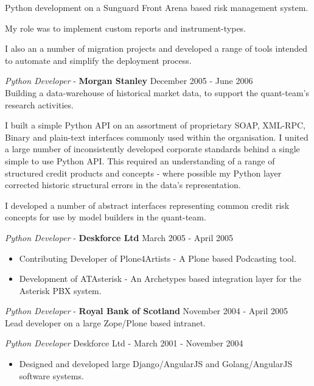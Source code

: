 \documentclass[margin, 10pt]{res} %
\begin{document}
\begin{resume}
        Python development on a Sunguard Front Arena based risk management system.

        My role was to implement custom reports and instrument-types.

        I also an a number of migration projects and developed a range of tools intended to automate and simplify the deployment process.

        {\sl Python Developer} - \textbf{Morgan Stanley} \hfill December 2005 - June 2006\\


        Building a data-warehouse of historical market data, to support the quant-team's research activities.

        I built a simple Python API on an assortment of proprietary SOAP, XML-RPC, Binary and plain-text interfaces commonly used within the organisation. I united a large number of inconsistently developed corporate standards behind a single simple to use Python API. This required an understanding of a range of structured credit products and concepts - where possible my Python layer corrected historic structural errors in the data's representation.

        I developed a number of abstract interfaces representing common credit risk concepts for use by model builders in the quant-team.

        {\sl Python Developer} - \textbf{Deskforce Ltd} \hfill March 2005 - April 2005\\

        \begin{itemize}
            \item Contributing Developer of Plone4Artists - A Plone based Podcasting tool.
            \item Development of ATAsterisk - An Archetypes based integration layer for the Asterisk PBX system.
        \end{itemize}

        {\sl Python Developer} - \textbf{Royal Bank of Scotland} \hfill November 2004 - April 2005\\

        Lead developer on a large Zope/Plone based intranet.

        {\sl Python Developer} \hfill Deskforce Ltd - March 2001 - November 2004\\

        \begin{itemize}
            \item Designed and developed large Django/AngularJS and Golang/AngularJS software systems.
        \end{itemize}


\end{resume}
\end{document}
